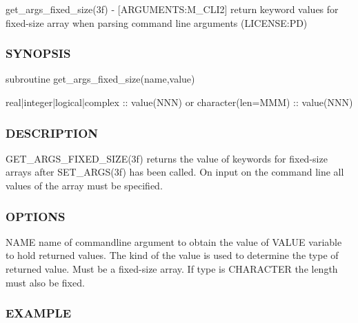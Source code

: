 get\+\_\+args\+\_\+fixed\+\_\+size(3f) -\/ \mbox{[}A\+R\+G\+U\+M\+E\+N\+TS\+:M\+\_\+\+C\+L\+I2\mbox{]} return keyword values for fixed-\/size array when parsing command line arguments (L\+I\+C\+E\+N\+SE\+:PD)

\subsubsection*{S\+Y\+N\+O\+P\+S\+IS}

\begin{DoxyVerb}subroutine get_args_fixed_size(name,value)

 real|integer|logical|complex :: value(NNN)
    or
 character(len=MMM) :: value(NNN)
\end{DoxyVerb}


\subsubsection*{D\+E\+S\+C\+R\+I\+P\+T\+I\+ON}

\begin{DoxyVerb}GET_ARGS_FIXED_SIZE(3f) returns the value of keywords for
fixed-size arrays after SET_ARGS(3f) has been called.
On input on the command line all values of the array must
be specified.
\end{DoxyVerb}


\subsubsection*{O\+P\+T\+I\+O\+NS}

\begin{DoxyVerb}NAME   name of commandline argument to obtain the value of
VALUE  variable to hold returned values. The kind of the value
       is used to determine the type of returned value.
       Must be a fixed-size  array. If type is CHARACTER the
       length must also be fixed.
\end{DoxyVerb}


\subsubsection*{E\+X\+A\+M\+P\+LE}

